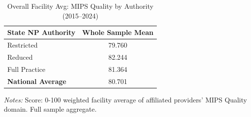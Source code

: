 \begin{table}[htbp]
    \centering
    \caption{Overall Facility Avg: MIPS Quality by Authority (2015--2024)}
    \label{tab:fac_mips_quality_score_full}
    \vspace{0.2cm}
    \begin{tabular}{lc}
        \toprule
        \textbf{State NP Authority} & \textbf{Whole Sample Mean} \\
        \midrule
        Restricted & 79.760 \\
        Reduced & 82.244 \\
        Full Practice & 81.364 \\
        \midrule
        \textbf{National Average} & 80.701 \\
        \bottomrule
    \end{tabular}
    \vspace{0.1cm}
    \begin{minipage}{0.6\textwidth}
        \footnotesize \textit{Notes:} Score: 0-100 weighted facility average of affiliated providers' MIPS Quality domain. Full sample aggregate.
    \end{minipage}
\end{table}